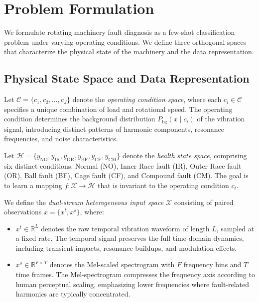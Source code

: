 \section{Problem Formulation}
\label{sec:problem}

We formulate rotating machinery fault diagnosis as a few-shot classification problem under varying operating conditions. We define three orthogonal spaces that characterize the physical state of the machinery and the data representation.

\subsection{Physical State Space and Data Representation}

Let $\mathcal{C} = \{c_1, c_2, \dots, c_J\}$ denote the \textit{operating condition space}, where each $c_i \in \mathcal{C}$ specifies a unique combination of load and rotational speed. The operating condition determines the background distribution $P_{\text{bg}}(x \mid c_i)$ of the vibration signal, introducing distinct patterns of harmonic components, resonance frequencies, and noise characteristics.

Let $\mathcal{H} = \{y_{\text{NO}}, y_{\text{IR}}, y_{\text{OR}}, y_{\text{BF}}, y_{\text{CF}}, y_{\text{CM}}\}$ denote the \textit{health state space}, comprising six distinct conditions: Normal (NO), Inner Race fault (IR), Outer Race fault (OR), Ball fault (BF), Cage fault (CF), and Compound fault (CM). The goal is to learn a mapping $f: \mathcal{X} \rightarrow \mathcal{H}$ that is invariant to the operating condition $c_i$.

We define the \textit{dual-stream heterogeneous input space} $\mathcal{X}$ consisting of paired observations $x = \{x^t, x^s\}$, where:
\begin{itemize}
    \item $x^t \in \mathbb{R}^L$ denotes the raw temporal vibration waveform of length $L$, sampled at a fixed rate. The temporal signal preserves the full time-domain dynamics, including transient impacts, resonance buildups, and modulation effects.
    \item $x^s \in \mathbb{R}^{F \times T}$ denotes the Mel-scaled spectrogram with $F$ frequency bins and $T$ time frames. The Mel-spectrogram compresses the frequency axis according to human perceptual scaling, emphasizing lower frequencies where fault-related harmonics are typically concentrated.
\end{itemize}

